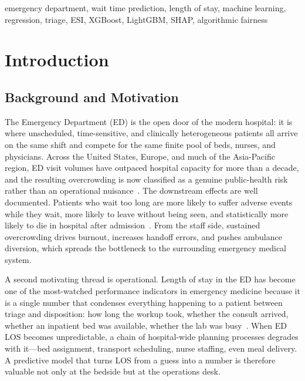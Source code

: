 \documentclass[conference]{IEEEtran}
\begin{document}
\begin{IEEEkeywords}
emergency department, wait time prediction, length of stay, machine learning,
regression, triage, ESI, XGBoost, LightGBM, SHAP, algorithmic fairness
\end{IEEEkeywords}

\section{Introduction}

\subsection{Background and Motivation}
The Emergency Department (ED) is the open door of the modern hospital: it is
where unscheduled, time-sensitive, and clinically heterogeneous patients all
arrive on the same shift and compete for the same finite pool of beds,
nurses, and physicians. Across the United States, Europe, and much of the
Asia-Pacific region, ED visit volumes have outpaced hospital capacity for
more than a decade, and the resulting overcrowding is now classified as a
genuine public-health risk rather than an operational nuisance~\cite{morley2018,
derlet2002}. The downstream effects are well documented. Patients who wait
too long are more likely to suffer adverse events while they wait, more
likely to leave without being seen, and statistically more likely to die in
hospital after admission~\cite{bernstein2009}. From the staff side, sustained
overcrowding drives burnout, increases handoff errors, and pushes ambulance
diversion, which spreads the bottleneck to the surrounding emergency medical
system.

A second motivating thread is operational. Length of stay in the ED has
become one of the most-watched performance indicators in emergency medicine
because it is a single number that condenses everything happening to a
patient between triage and disposition: how long the workup took, whether
the consult arrived, whether an inpatient bed was available, whether the lab
was busy~\cite{ricciardi2024}. When ED LOS becomes unpredictable, a chain of
hospital-wide planning processes degrades with it---bed assignment, transport
scheduling, nurse staffing, even meal delivery. A predictive model that
turns LOS from a guess into a number is therefore valuable not only at the
bedside but at the operations desk.
\end{document}
